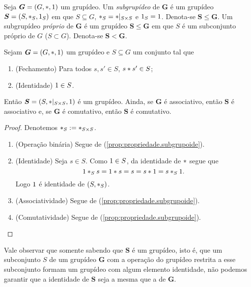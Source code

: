 \begin{definition}
Seja $\bm G=(G,\ast,1)$ um grupídeo. Um \emph{subgrupídeo} de $\bm G$ é um grupídeo $\bm S=(S,\ast _S,1_S)$ em que $S \subseteq G$, $\ast _S= \ast |_{S \times S}$ e $1_S=1$. Denota-se $\bm S \leq \bm G$. Um subgrupídeo \emph{próprio} de $\bm G$ é um grupídeo $\bm S \leq \bm G$ em que $S$ é um subconjunto próprio de $G$ ($S \subset G$). Denota-se $\bm S < \bm G$.
\end{definition}

\begin{proposition}
\label{prop:propriedade.subgrupideo}
Sejam $\bm G=(G,\ast,1)$ um grupídeo e $S \subseteq G$ um conjunto tal que
	\begin{enumerate}[label=\textbf{SM\arabic*.},ref={SM\arabic*}]
	\item \label{SM1} (Fechamento) Para todos $s,s' \in S$, $s \ast s' \in S$;
	\item \label{SM2} (Identidade) $1 \in S$.
	\end{enumerate}
\noindent
Então $\bm S=(S,\ast|_{S \times S},1)$ é um grupídeo. Ainda, se $\bm G$ é associativo, então $\bm S$ é associativo e, se $\bm G$ é comutativo, então $\bm S$ é comutativo.
\end{proposition}
\begin{proof} Denotemos $\ast_S :=  \ast _{S \times S}$.
	\begin{enumerate}
	\item (Operação binária) Segue de (\ref{prop:propriedade.subgrupoide}).

	\item (Identidade) Seja $s \in S$. Como $1 \in S$, da identidade de $\ast$ segue que
		\begin{equation*}
		1 \ast_S s = 1 \ast s = s = s \ast 1 = s \ast_S 1.
		\end{equation*}
	Logo $1$ é identidade de $(S,\ast_S)$.

	\item (Associatividade) Segue de (\ref{prop:propriedade.subgrupoide}).

	\item (Comutatividade) Segue de (\ref{prop:propriedade.subgrupoide}).
	\qedhere
	\end{enumerate}
\end{proof}

Vale observar que somente sabendo que $\bm S$ é um grupídeo, isto é, que um subconjunto $S$ de um grupídeo $\bm G$ com a operação do grupídeo restrita a esse subconjunto formam um grupídeo com algum elemento identidade, não podemos garantir que a identidade de $\bm S$ seja a mesma que a de $\bm G$.

